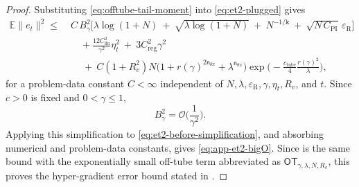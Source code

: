 \documentclass{article}
\theoremstyle{normaltheorem}
\newcommand{\dimk}{\texttt{k}}
\begin{document}
\begin{proof}
Substituting \eqref{eq:offtube-tail-moment} into \eqref{eq:et2-plugged} gives
\begin{equation}\label{eq:et2-before-simplification}
\begin{aligned}
\mathbb E\|e_t\|^2
\le\;&
C\,B_\gamma^2
\Big[
\lambda\log(1+N)
\ +\ \sqrt{\lambda\log(1+N)}
\ +\ N^{-1/\dimk}
\ +\ \sqrt{N\,C_{\mathrm{PI}}}\,\varepsilon_{\mathrm R}
\Big]\\
&\quad
+\frac{12C_{\mathrm{lin}}^2}{\gamma^2}\eta_t^2
\ +\ 3C_{\mathrm{reg}}^2\gamma^2\\
&\quad
\ +\ C(1+R_v^2)N
\big(1+r(\gamma)^{2\mathsf n_{\theta x}}+\lambda^{\mathsf n_{\theta x}}\big)
\exp\!\Big(-\tfrac{c_{\mathrm{tube}}}{4}\tfrac{r(\gamma)^2}{\lambda}\Big),
\end{aligned}
\end{equation}
for a problem-data constant \(C<\infty\) independent of
\(N,\lambda,\varepsilon_{\mathrm R},\gamma,\eta_t,R_v\), and \(t\).
Since \(c>0\) is fixed and \(0<\gamma\le1\),
\[
B_\gamma^2
=
\mathcal{O}\!\Big(\frac{1}{\gamma^2}\Big).
\]
	Applying this simplification to \eqref{eq:et2-before-simplification}, and absorbing numerical and problem-data constants,
	gives \eqref{eq:app-et2-bigO}.
	Since  is the same bound with the exponentially small off-tube term abbreviated as
	\(\mathsf{OT}_{\gamma,\lambda,N,R_v}\), this proves the hyper-gradient error bound stated in .
	\end{proof}
\end{document}
